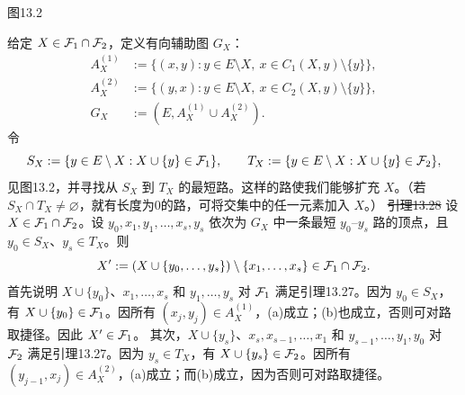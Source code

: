 \begin{center}
\par\small 图13.2
\end{center}
给定 $X\in\mathcal F_1\cap\mathcal F_2$，定义有向辅助图 $G_X$：
\begin{align*}
A_X^{(1)}&:=\{(x,y):y\in E\setminus X,\ x\in C_1(X,y)\setminus\{y\}\},\\
A_X^{(2)}&:=\{(y,x):y\in E\setminus X,\ x\in C_2(X,y)\setminus\{y\}\},\\
G_X&:=(E,A_X^{(1)}\cup A_X^{(2)}).
\end{align*}
令
\[S_X:=\{y\in E\setminus X:X\cup\{y\}\in\mathcal F_1\},\qquad
T_X:=\{y\in E\setminus X:X\cup\{y\}\in\mathcal F_2\},\]
见图13.2，并寻找从 $S_X$ 到 $T_X$ 的最短路。这样的路使我们能够扩充 $X$。（若 $S_X\cap T_X\ne\varnothing$，就有长度为0的路，可将交集中的任一元素加入 $X$。）
\st{引理13.28} 设 $X\in\mathcal F_1\cap\mathcal F_2$。设 $y_0,x_1,y_1,\ldots,x_s,y_s$ 依次为 $G_X$ 中一条最短 $y_0$--$y_s$ 路的顶点，且 $y_0\in S_X$、$y_s\in T_X$。则
\[X':=(X\cup\{y_0,\ldots,y_s\})\setminus\{x_1,\ldots,x_s\}\in\mathcal F_1\cap\mathcal F_2.\]
\pr 首先说明 $X\cup\{y_0\}$、$x_1,\ldots,x_s$ 和 $y_1,\ldots,y_s$ 对 $\mathcal F_1$ 满足引理13.27。因为 $y_0\in S_X$，有 $X\cup\{y_0\}\in\mathcal F_1$。因所有 $(x_j,y_j)\in A_X^{(1)}$，(a)成立；(b)也成立，否则可对路取捷径。因此 $X'\in\mathcal F_1$。
其次，$X\cup\{y_s\}$、$x_s,x_{s-1},\ldots,x_1$ 和 $y_{s-1},\ldots,y_1,y_0$ 对 $\mathcal F_2$ 满足引理13.27。因为 $y_s\in T_X$，有 $X\cup\{y_s\}\in\mathcal F_2$。因所有 $(y_{j-1},x_j)\in A_X^{(2)}$，(a)成立；而(b)成立，因为否则可对路取捷径。

